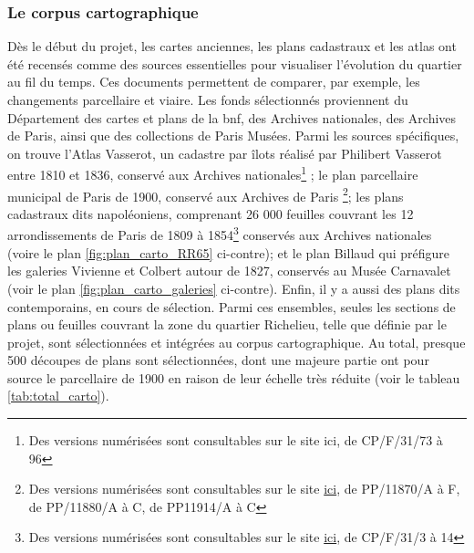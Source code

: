 \subsubsection{Le corpus cartographique}
Dès le début du projet, les cartes anciennes, les plans cadastraux et les atlas ont été recensés comme des sources essentielles pour visualiser l'évolution du quartier au fil du temps. Ces documents permettent de comparer, par exemple, les changements parcellaire et viaire. Les fonds sélectionnés proviennent du Département des cartes et plans de la \acrshort{bnf}, des Archives nationales, des Archives de Paris, ainsi que des collections de Paris Musées. Parmi les sources spécifiques, on trouve l'Atlas Vasserot, un cadastre par îlots réalisé par Philibert Vasserot entre 1810 et 1836, conservé aux Archives nationales\footnote{Des versions numérisées sont consultables sur le site ici, de CP/F/31/73 à 96} ; le plan parcellaire municipal de Paris de 1900, conservé aux Archives de Paris \footnote{Des versions numérisées sont consultables sur le site \href{https://archives.paris.fr/f/planspacellaires/tableau/?&crit1=14&v_14_1=02}{ici}, de PP/11870/A à F, de PP/11880/A à C, de PP11914/A à C}; les plans cadastraux dits napoléoniens, comprenant 26 000 feuilles couvrant les 12 arrondissements de Paris de 1809 à 1854\footnote{Des versions numérisées sont consultables sur le site \href{https://www.siv.archives-nationales.culture.gouv.fr/siv/rechercheconsultation/consultation/ir/consultationIR.action?irId=FRAN_IR_059652}{ici}, de CP/F/31/3 à 14} conservés aux Archives nationales (voire le plan \ref{fig:plan_carto_RR65} ci-contre); et le plan Billaud  qui préfigure les galeries Vivienne et Colbert autour de 1827, conservés au Musée Carnavalet (voir le plan \ref{fig:plan_carto_galeries} ci-contre). Enfin, il y a aussi des plans dits contemporains, en cours de sélection. Parmi ces ensembles, seules les sections de plans ou feuilles couvrant la zone du quartier Richelieu, telle que définie par le projet, sont sélectionnées et intégrées au corpus cartographique. Au total, presque 500 découpes de plans sont sélectionnées, dont une majeure partie ont pour source le parcellaire de 1900 en raison de leur échelle très réduite (voir le tableau \ref{tab:total_carto}). 


